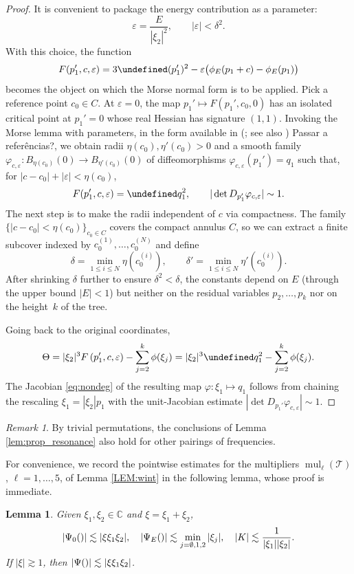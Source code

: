 \documentclass[a4paper,
11pt,  reqno]{amsart}
\makeatletter
\newcommand{\blue}{\color{blue}}
\newcommand{\orange}{\color{orange}}
\newcommand{\5}{\textup{V}}
\newtheorem{lemma}[theorem]{Lemma}
\theoremstyle{remark}
\newtheorem{remark}[theorem]{Remark}
\newcommand{\CC}{\mathbb{C}}
\let\Re=\undefined\DeclareMathOperator*{\Re}{Re}
\newcommand{\TT}{\mathcal{T}}
\DeclareMathOperator{\mul}{mul}
\def\<#1>{\csname MH@symb@#1\endcsname}
\numberwithin{equation}{section}
\numberwithin{theorem}{section}
\makeatother
\begin{document}
\begin{proof}
It is convenient to package the energy contribution as a parameter:
$$
\varepsilon=\frac{E}{|\xi_2|^2},\qquad |\varepsilon|<\delta^2.
$$
With this choice, the function
$$
F(p_1', c, \varepsilon) = 3\Re (p_1')^2 - \varepsilon \bigl(\phi_E(p_1+c) - \phi_E(p_1)\bigr)
$$
becomes the object on which the Morse normal form is to be applied. Pick a reference point $c_0\in C$. At $\varepsilon=0$, the map $p_1'\mapsto F(p_1', c_0, 0)$ has an isolated critical point at $p_1'=0$ whose real Hessian has signature $(1,1)$. Invoking the Morse lemma with parameters, in the form available in {\orange (\cite[Lemma~C.6.1]{hormander1}; see also \cite[Section~3.4]{duistermaat})} {\blue Passar a referências?}, we obtain radii $\eta(c_0),\eta'(c_0)>0$ and a smooth family $\varphi_{c,\varepsilon}:B_{\eta(c_0)}(0)\to B_{\eta'(c_0)}(0)$ of diffeomorphisms $\varphi_{c,\varepsilon}(p_1')=q_1$ such that, for $|c-c_0|+|\varepsilon|<\eta(c_0)$,
$$
F(p_1', c, \varepsilon) = \Re q_1^2,\qquad |\det D_{p_1'}\varphi_{c,\varepsilon}|\sim 1.
$$
The next step is to make the radii independent of $c$ via compactness. The family $\{|c-c_0|<\eta(c_0)\}_{c_0\in C}$ covers the compact annulus $C$, so we can extract a finite subcover indexed by $c_0^{(1)},\dots,c_0^{(N)}$ and define
$$
\delta=\min_{1\le i\le N}\eta(c_0^{(i)}),\qquad \delta'=\min_{1\le i\le N}\eta'(c_0^{(i)}).
$$
After shrinking $\delta$ further to ensure $\delta^2<\delta$, the constants depend on $E$ (through the upper bound $|E|<1$) but neither on the residual variables $p_2,\dots,p_k$ nor on the height~$k$ of the tree.

Going back to the original coordinates,
$$
\Theta = |\xi_2|^3 F\left(p_1', c, \varepsilon\right) - \sum_{j=2}^k \phi(\xi_j) =  |\xi_2|^3\Re q_1^2 - \sum_{j=2}^k \phi(\xi_j).
$$
The Jacobian \eqref{eq:nondeg} of the resulting map $\varphi:\xi_1\mapsto q_1$ follows from chaining the rescaling $\xi_1=|\xi_2|p_1$ with the unit-Jacobian estimate $|\det D_{p_1'}\varphi_{c,\varepsilon}|\sim 1$.
\end{proof}

\begin{remark}
By trivial permutations, the conclusions of Lemma \ref{lem:prop_resonance} also hold for other pairings of frequencies.
\end{remark}

For convenience, we record the pointwise estimates for the multipliers $\mul_\ell(\TT)$, $\ell=1,\dots,5$, of Lemma \ref{LEM:wint} in the following lemma, whose proof is immediate.

\begin{lemma}\label{lem:pointwise_multipliers}
Given $\xi_1,\xi_2\in\CC$ and $\xi=\xi_1+\xi_2$,
$$
|\Psi_0(\<1>)|\lesssim |\xi\xi_1\xi_2|,\quad  |\Psi_E(\<1>)|\lesssim \min_{j=\emptyset, 1,2}|\xi_j|,\quad |K|\lesssim \frac{1}{|\xi_1||\xi_2|}.
$$
If $|\xi|\gtrsim 1$, then $|\Psi(\<1>)|\lesssim |\xi\xi_1\xi_2|$.
\end{lemma}
\end{document}
